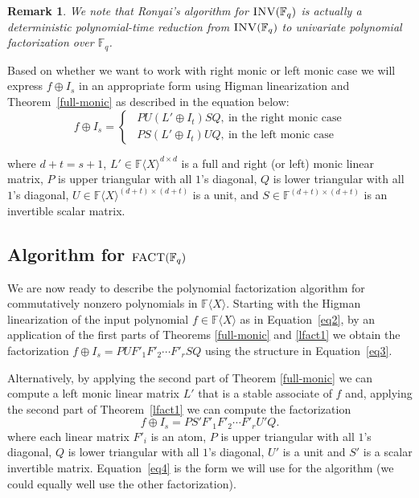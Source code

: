 \documentclass[10pt,a4paper]{article}
\newtheorem{remark}[theorem]{Remark}
\newcommand{\F}{\mathbb{F}}
\renewcommand{\angle}[1]{\langle #1 \rangle}
\newcommand{\FX}{\F\angle{X}}
\newcommand{\fR}{\FX}
\newcommand{\prob}[1]{\textsc{#1}}
\begin{document}
\begin{remark}
We note that Ronyai's algorithm \cite{Ronyai2} for $\prob{INV}(\F_q)$
is actually a deterministic polynomial-time \emph{reduction} from
$\prob{INV}(\F_q)$ to univariate polynomial factorization over $\F_q$.
\end{remark}  

 
%
%
%

Based on whether we want to work with right monic or left
monic case we will express $f \oplus I_s$ in an appropriate form using
Higman linearization and Theorem~\ref{full-monic} as described in the
equation below:
\begin{equation}\label{eq2}
f\oplus I_s = 
\begin{cases}
~~PU(L'\oplus I_t) SQ,~ \text{in the right monic case}\\ 
~~PS(L'\oplus I_{t}) UQ,~ \text{in the left monic case} 
\end{cases}
\end{equation}


where $d+t=s+1$, $L'\in\fR^{d\times d}$ is a full and right (or left) monic linear
matrix, $P$ is upper triangular with all $1$'s diagonal, $Q$ is lower
triangular with all $1$'s diagonal, $U\in\fR^{(d+t)\times (d+t)}$ is a
unit, and $S\in\F^{(d+t)\times (d+t)}$ is an invertible scalar
matrix. 


\subsection*{Algorithm for $\prob{FACT}(\F_q)$}

We are now ready to describe the polynomial factorization algorithm
for commutatively nonzero polynomials in $\fR$. Starting with the
Higman linearization of the input polynomial $f\in\fR$ as in
Equation~\ref{eq2}, by an application of the first parts of Theorems
\ref{full-monic} and \ref{lfact1} we obtain the factorization
$f\oplus I_s = PUF'_1F'_2\cdots F'_r SQ$ using the structure in
Equation~\ref{eq3}. 

Alternatively, by applying the second part of Theorem \ref{full-monic}
we can compute a left monic linear matrix $L'$ that is a stable
associate of $f$ and, applying the second part of Theorem~\ref{lfact1}
we can compute the factorization
\begin{equation}\label{eq4}
f\oplus I_s = PS'F'_1F'_2\cdots F'_r U'Q.
\end{equation}
where each linear matrix $F'_i$ is an atom, $P$ is upper triangular
with all $1$'s diagonal, $Q$ is lower triangular with all $1$'s
diagonal, $U'$ is a unit and $S'$ is a scalar invertible matrix.
Equation~\ref{eq4} is the form we will use for the algorithm (we could
equally well use the other factorization).
\end{document}
